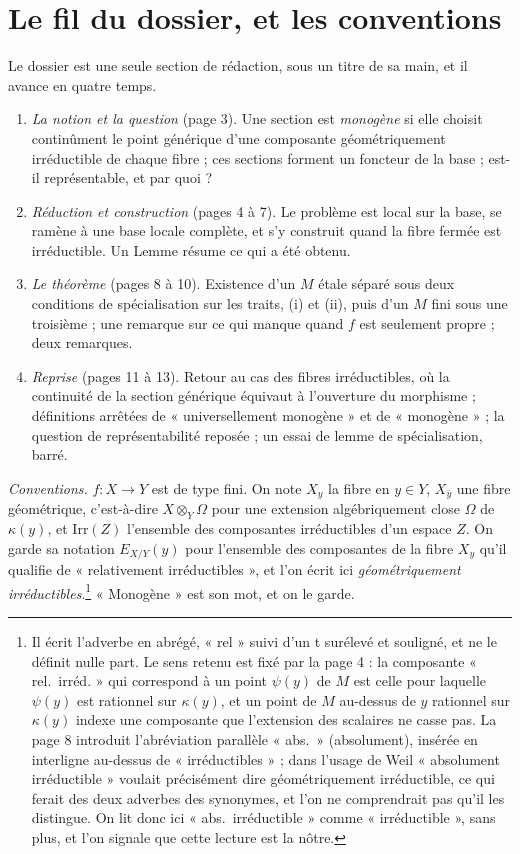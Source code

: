 \documentclass[11pt,a4paper]{article}
\begin{document}
\section*{Le fil du dossier, et les conventions}

Le dossier est une seule section de rédaction, sous un titre de sa main, et il
avance en quatre temps.

\begin{enumerate}
\item[1.] \emph{La notion et la question} (page 3). Une section est
\emph{monogène} si elle choisit continûment le point générique d'une
composante géométriquement irréductible de chaque fibre ; ces sections forment
un foncteur de la base ; est-il représentable, et par quoi ?
\item[2.] \emph{Réduction et construction} (pages 4 à 7). Le problème est
local sur la base, se ramène à une base locale complète, et s'y construit
quand la fibre fermée est irréductible. Un Lemme résume ce qui a été obtenu.
\item[3.] \emph{Le théorème} (pages 8 à 10). Existence d'un $M$ étale séparé
sous deux conditions de spécialisation sur les traits, (i) et (ii), puis d'un
$M$ fini sous une troisième ; une remarque sur ce
qui manque quand $f$ est seulement propre ; deux remarques.
\item[4.] \emph{Reprise} (pages 11 à 13). Retour au cas des fibres
irréductibles, où la continuité de la section générique équivaut à
l'ouverture du morphisme ; définitions arrêtées de « universellement
monogène » et de « monogène » ; la question de représentabilité reposée ;
un essai de lemme de spécialisation, barré.
\end{enumerate}

\emph{Conventions.} $f : X \to Y$ est de type fini. On note $X_y$ la fibre en
$y \in Y$, $X_{\bar{y}}$ une fibre géométrique, c'est-à-dire
$X \otimes_{Y} \Omega$ pour une extension algébriquement close $\Omega$ de
$\kappa(y)$, et $\mathrm{Irr}(Z)$ l'ensemble des composantes irréductibles d'un
espace $Z$. On garde sa notation $E_{X/Y}(y)$ pour l'ensemble des composantes
de la fibre $X_y$ qu'il qualifie de « relativement irréductibles », et l'on
écrit ici \emph{géométriquement irréductibles}.\footnote{Il écrit l'adverbe en
abrégé, « rel » suivi d'un t surélevé et souligné, et ne le définit nulle part.
Le sens retenu est fixé par la page 4 : la composante « rel.\ irréd. » qui
correspond à un point $\psi(y)$ de $M$ est celle pour laquelle $\psi(y)$ est
rationnel sur $\kappa(y)$, et un point de $M$ au-dessus de $y$ rationnel sur
$\kappa(y)$ indexe une composante que l'extension des scalaires ne casse pas.
La page 8 introduit l'abréviation parallèle « abs.\ » (absolument), insérée en
interligne au-dessus de « irréductibles » ; dans l'usage de Weil « absolument
irréductible » voulait précisément dire géométriquement irréductible, ce qui
ferait des deux adverbes des synonymes, et l'on ne comprendrait pas qu'il les
distingue. On lit donc ici « abs.\ irréductible » comme « irréductible »,
sans plus, et l'on signale que cette lecture est la nôtre.} « Monogène » est
son mot, et on le garde.
\end{document}
